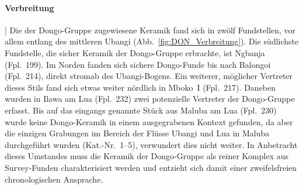 \paragraph{Verbreitung}\hspace{-.5em}|\hspace{.5em}%
Die der Dongo-Gruppe zugewiesene Keramik fand sich in zwölf Fundstellen, vor allem entlang des mittleren \mbox{Ubangi} (Abb.~\ref{fig:DON_Verbreitung}). Die südlichste Fundstelle, die sicher Keramik der Dongo-Gruppe erbrachte, ist \mbox{Ngbanja} (Fpl.~199). Im Norden fanden sich sichere Dongo-Funde bis nach Balongoi (Fpl.~214), direkt stromab des \mbox{Ubangi}-Bogens. Ein weiterer, möglicher Vertreter dieses Stils fand sich etwas weiter nördlich in Mboko~I (Fpl.~217). Daneben wurden in Ilawa am Lua (Fpl.~232) zwei potenzielle Vertreter der Dongo-Gruppe erfasst. Bis auf das eingangs genannte Stück aus Maluba am Lua (Fpl.~230) wurde keine Dongo-Keramik in einem ausgegrabenen Kontext gefunden, da aber die einzigen Grabungen im Bereich der Flüsse \mbox{Ubangi} und Lua in Maluba durchgeführt wurden (Kat.-Nr.~1--5), verwundert dies nicht weiter. In Anbetracht dieses Umstandes muss die Keramik der Dongo-Gruppe als reiner Komplex aus Survey-Funden charakterisiert werden und entzieht sich damit einer zweifelsfreien chronologischen Ansprache.
